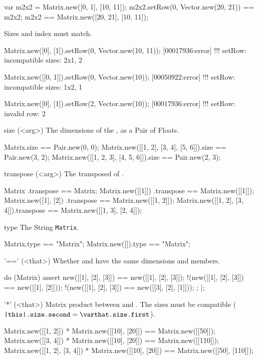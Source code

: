 \begin{urbiscriptapi}
\begin{urbiassert}
var m2x2 = Matrix.new([0, 1], [10, 11]);
m2x2.setRow(0, Vector.new(20, 21)) == m2x2;
m2x2 == Matrix.new([20, 21], [10, 11]);
\end{urbiassert}

  Sizes and index must match.
\begin{urbiscript}
Matrix.new([0], [1]).setRow(0, Vector.new(10, 11));
[00017936:error] !!! setRow: incompatible sizes: 2x1, 2

Matrix.new([[0, 1]]).setRow(0, Vector.new(10));
[00050922:error] !!! setRow: incompatible sizes: 1x2, 1

Matrix.new([0], [1]).setRow(2, Vector.new(10));
[00017936:error] !!! setRow: invalid row: 2
\end{urbiscript}


\item[size](<arg>)%
  The dimensions of the \this, as a Pair of Floats.
\begin{urbiassert}
Matrix.size == Pair.new(0, 0);
Matrix.new([[1, 2], [3, 4], [5, 6]]).size == Pair.new(3, 2);
Matrix.new([[1, 2, 3], [4, 5, 6]]).size == Pair.new(2, 3);
\end{urbiassert}

\item[transpose](<arg>)%
  The transposed of \this.
\begin{urbiassert}
Matrix                      .transpose == Matrix;
Matrix.new([[1]])           .transpose == Matrix.new([[1]]);
Matrix.new([1], [2])        .transpose == Matrix.new([[1, 2]]);
Matrix.new([[1, 2], [3, 4]]).transpose == Matrix.new([[1, 3], [2, 4]]);
\end{urbiassert}


\item[type]%
  The String \lstinline|Matrix|.
\begin{urbiassert}
Matrix.type         == "Matrix";
Matrix.new([]).type == "Matrix";
\end{urbiassert}


\item['=='](<that>)%
  Whether \this and \that have the same dimensions and members.
\begin{urbiscript}
do (Matrix)
{
  assert
  {
      new([[1], [2], [3]]) == new([[1], [2], [3]]);
    !(new([[1], [2], [3]]) == new([[1], [2]]));
    !(new([[1], [2], [3]]) == new([[3], [2], [1]]));
  };
}|;
\end{urbiscript}


\item['*'](<that>)%
  Matrix product between \this and \that.  The sizes must be compatible
  ($\texttt{\this.size.second} = \texttt{\that.size.first}$).
\begin{urbiassert}
Matrix.new([[1, 2]]) * Matrix.new([[10], [20]])
  == Matrix.new([[50]]);
Matrix.new([[3, 4]]) * Matrix.new([[10], [20]])
  == Matrix.new([[110]]);
Matrix.new([[1, 2], [3, 4]]) * Matrix.new([[10], [20]])
  == Matrix.new([[50], [110]]);
\end{urbiassert}



\end{urbiscriptapi}
